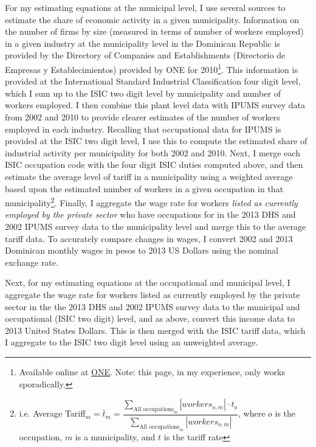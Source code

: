 \documentclass[12pt]{article}
\begin{document}
For my estimating equations at the municipal level,
I use several sources to estimate the share of economic activity in a given municipality.
Information on the number of firms by size (measured in terms of
number of workers employed) in a given industry at the 
municipality level in the Dominican Republic is provided by the 
Directory of Companies and Establishments (Directorio de Empresas y Establecimientos)
provided by 
ONE for 2010\footnote{Available online at \href{http://www.one.gov.do/recursos-automatizados/
323/directorio-de-empresas-y-establecimientos/}{ONE}. Note: this page, in my experience,
only works sporadically.}. This information is provided
at the International Standard Industrial Classification four digit level, which I sum
up to the ISIC two digit level by municipality and number of workers employed.
I then combine this plant level data with IPUMS survey data from 2002 and 2010 to provide 
clearer estimates of the number of workers employed in each industry. Recalling that occupational data
for IPUMS is provided at the ISIC two digit level, I use this to compute the estimated
share of industrial activity per municipality for both 2002 and 2010.
Next, I merge each ISIC occupation code with the four digit ISIC duties computed above, 
and then estimate the average level of tariff in a municipality using a weighted average
based upon the estimated number of workers in a given occupation in that 
municipality\footnote{i.e. Average Tariff$_m = \bar{t}_m =
\dfrac{\displaystyle \sum_{\text{All occupations}_m} |workers_{o,m}| \cdot t_o}
{\displaystyle \sum_{\text{All occupations}_m} |workers_{o,m}|}$, where $o$ is the 
occupation, $m$ is a municipality, and $t$ is the tariff rate}. Finally, I aggregate
the wage rate for workers \textit{listed as currently employed by the private sector} who 
have occupations for in the 2013 DHS 
and 2002 IPUMS survey data to the municipality level and merge
this to the average tariff data. 
To accurately compare changes in wages, I convert 2002 
and 2013 Dominican monthly wages in pesos to 2013 US Dollars using the nominal exchange rate.

Next, for my estimating equations at the occupational 
and municipal level,
I aggregate the wage rate for workers listed as currently employed by the private sector
in the the 2013 DHS and 2002 IPUMS survey data to the 
municipal and occupational (ISIC two digit) level, and as above, 
convert this income data to 2013 United States Dollars. 
This is then merged with the ISIC tariff data, which I aggregate to the ISIC two digit level using
an unweighted average. 
\end{document}
